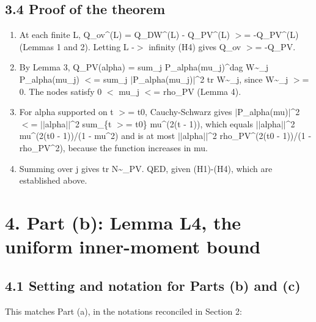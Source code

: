\documentclass[11pt,a4paper]{article}
\begin{document}
\subsection*{3.4 Proof of the theorem}
\begin{enumerate}
\item{} At each finite L, Q\_ov\textasciicircum{}(L) = Q\_DW\textasciicircum{}(L) - Q\_PV\textasciicircum{}(L) $>$= -Q\_PV\textasciicircum{}(L) (Lemmas 1 and 2). Letting L -$>$ infinity (H4) gives
Q\_ov $>$= -Q\_PV.
\item{} By Lemma 3, Q\_PV(alpha) = sum\_j P\_alpha(mu\_j)\textasciicircum{}dag W\textasciitilde{}\_j P\_alpha(mu\_j) $<$= sum\_j $|$P\_alpha(mu\_j)$|$\textasciicircum{}2 tr W\textasciitilde{}\_j, since
W\textasciitilde{}\_j $>$= 0. The nodes satisfy 0 $<$ mu\_j $<$= rho\_PV (Lemma 4).
\item{} For alpha supported on t $>$= t0, Cauchy-Schwarz gives $|$P\_alpha(mu)$|$\textasciicircum{}2 $<$= $|$$|$alpha$|$$|$\textasciicircum{}2 sum\_\{t $>$= t0\} mu\textasciicircum{}(2(t - 1)),
which equals $|$$|$alpha$|$$|$\textasciicircum{}2 mu\textasciicircum{}(2(t0 - 1))/(1 - mu\textasciicircum{}2) and is at most $|$$|$alpha$|$$|$\textasciicircum{}2 rho\_PV\textasciicircum{}(2(t0 - 1))/(1 - rho\_PV\textasciicircum{}2),
because the function increases in mu.
\item{} Summing over j gives tr N\textasciitilde{}\_PV. QED, given (H1)-(H4), which are established above.
\end{enumerate}


\section*{4. Part (b): Lemma L4, the uniform inner-moment bound}

\subsection*{4.1 Setting and notation for Parts (b) and (c)}
This matches Part (a), in the notations reconciled in Section 2:
\end{document}
